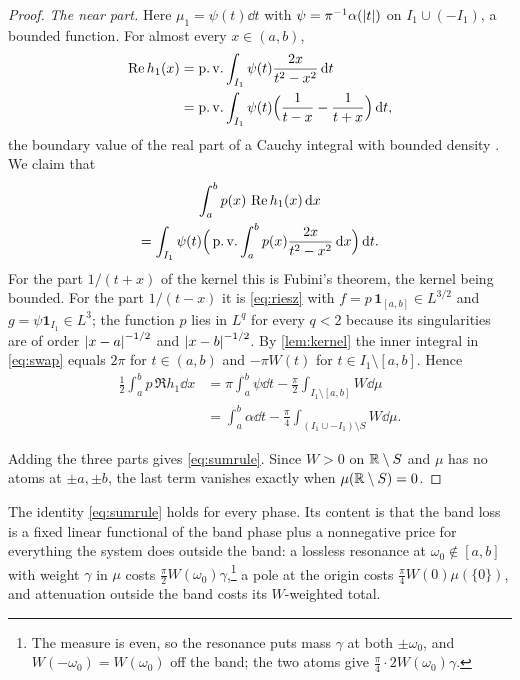 \begin{proof}
\emph{The near part.} Here $\mu_1=\psi(t)\dd t$ with $\psi=\pi^{-1}\alpha(\left|t\right|)$ on $I_1\cup(-I_1)$, a bounded function. For almost every $x\in(a,b)$,
\begin{align*}
\operatorname{Re} h_1(x)&=\operatorname{p.v.}\int_{I_1}\psi(t)\frac{2x}{t^2-x^2}\,\mathrm d t\\
&=\operatorname{p.v.}\int_{I_1}\psi(t)\Big(\frac1{t-x}-\frac1{t+x}\Big)\,\mathrm d t ,
\end{align*}
the boundary value of the real part of a Cauchy integral with bounded
density \cite{king,muskhelishvili}. We claim that
\begin{multline}\label{eq:swap}
\int_a^bp(x)\,\operatorname{Re} h_1(x)\,\mathrm d x\\
=\int_{I_1}\psi(t)\Big(\operatorname{p.v.}\int_a^bp(x)\frac{2x}{t^2-x^2}\,\mathrm d x\Big)\,\mathrm d t .
\end{multline}
For the part $1/(t+x)$ of the kernel this is Fubini's theorem, the kernel
being bounded. For the part $1/(t-x)$ it is \eqref{eq:riesz} with
$f=p\,\mathbf 1_{[a,b]}\in L^{3/2}$ and $g=\psi\mathbf 1_{I_1}\in L^{3}$; the
function $p$ lies in $L^q$ for every $q<2$ because its singularities are of
order $\left|x-a\right|^{-1/2}$ and $\left|x-b\right|^{-1/2}$. By \cref{lem:kernel}
the inner integral in \eqref{eq:swap} equals $2\pi$ for $t\in(a,b)$ and
$-\pi W(t)$ for $t\in I_1\setminus[a,b]$. Hence
\begin{align*}
\frac12\int_a^bp\,\Re h_1\dd x&=\pi\int_a^b\psi\dd t-\frac\pi2\int_{I_1\setminus[a,b]}W\dd\mu\\
&=\int_a^b\alpha\dd t-\frac\pi4\int_{(I_1\cup-I_1)\setminus S}W\dd\mu .
\end{align*}

Adding the three parts gives \eqref{eq:sumrule}. Since $W>0$ on $\mathbb R\setminus
S$ and $\mu$ has no atoms at $\pm a,\pm b$, the last term vanishes exactly
when $\mu(\mathbb R\setminus S)=0$.
\end{proof}

The identity \eqref{eq:sumrule} holds for every phase. Its content is that
the band loss is a fixed linear functional of the band phase plus a
nonnegative price for everything the system does outside the band: a
lossless resonance at $\omega_0\notin[a,b]$ with weight $\gamma$ in $\mu$ costs
$\frac\pi2W(\omega_0)\gamma$,\footnote{The measure is even, so the resonance puts mass $\gamma$ at both $\pm\omega_0$, and $W(-\omega_0)=W(\omega_0)$ off the band; the two atoms give $\frac\pi4\cdot2W(\omega_0)\gamma$.} a pole at the origin costs
$\frac\pi4W(0)\mu(\{0\})$, and attenuation outside the band costs its
$W$-weighted total.


